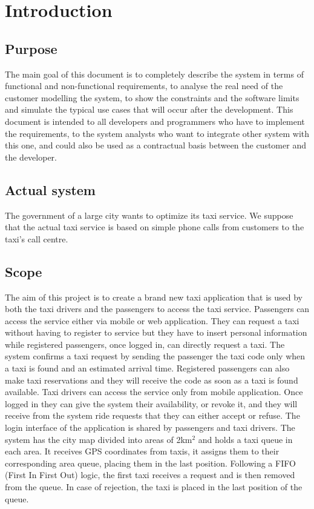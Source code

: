 \section{Introduction}
\subsection{Purpose}
The main goal of this document is to completely describe the system in terms of functional and non-functional requirements, to analyse the real need of the customer modelling the system, to show the constraints and the software limits and simulate the typical use cases that will occur after the development. This document is intended to all developers and programmers who have to implement the requirements, to the system analysts who want to integrate other system with this one, and could also be used as a contractual basis between the customer and the developer.
\subsection{Actual system}
The government of a large city wants to optimize its taxi service. We suppose that the actual taxi service is based on simple phone calls from customers to the taxi's call centre.
\subsection{Scope}
The aim of this project is to create a brand new taxi application that is used by both the taxi drivers and the passengers to access the taxi service. Passengers can access the service either via mobile or web application. They can request a taxi without having to register to service but they have to insert personal information while registered passengers, once logged in, can directly request a taxi. The system confirms a taxi request by sending the passenger the taxi code only when a taxi is found and an estimated arrival time. Registered passengers can also make taxi reservations and they will receive the code as soon as a taxi is found available. Taxi drivers can access the service only from mobile application. Once logged in they can give the system their availability, or revoke it, and they will receive from the system ride requests that they can either accept or refuse. The login interface of the application is shared by passengers and taxi drivers.
The system has the city map divided into areas of 2km$^{2}$ and holds a taxi queue in each area. It receives GPS coordinates from taxis, it assigns them to their corresponding area queue, placing them in the last position. Following a FIFO (First In First Out) logic, the first taxi receives a request and is then removed from the queue. In case of rejection, the taxi is placed in the last position of the queue.
